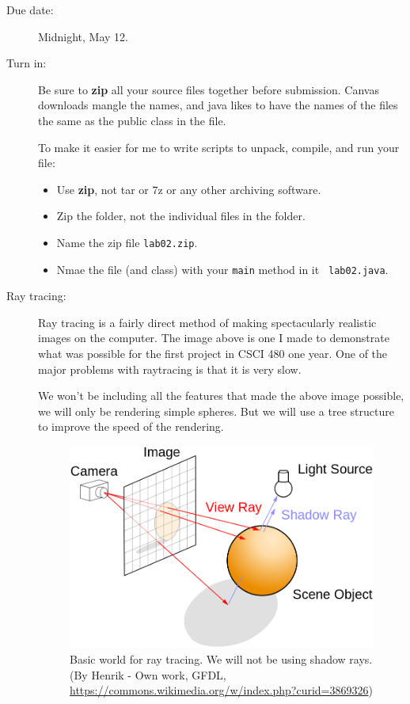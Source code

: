 \documentclass{article}
\begin{document}
\begin{description}

\item[Due date:] Midnight, May 12.

\item[Turn in:] Be sure to {\bf zip} all your source files together
  before submission.  Canvas downloads mangle the names, and java
  likes to have the names of the files the same as the public class in
  the file.

  To make
  it easier for me to write scripts to unpack, compile, and run your
  file:
  \begin{itemize}
    \item
      Use {\bf zip}, not tar or 7z or any other archiving software.
      \item Zip the folder, not the individual  files in the folder.
      \item Name the zip file {\tt lab02.zip}.
\item
  Nmae the file (and class) with your {\tt main} method in it {\tt
    lab02.java}. 
  \end{itemize}
  
\item[Ray tracing:]
Ray tracing is a fairly direct method of making spectacularly
realistic images on the computer.  The image above is one I made to
demonstrate what was possible for the first project in CSCI 480 one
year.  One of the major problems with raytracing is that it is very
slow. 

We won't be including all the features that made the above image
possible, we will only be rendering simple spheres.  But we will use a
tree structure to improve the speed of the rendering.


  \begin{figure}
\centerline{\includegraphics[scale=0.25]{Ray_trace_diagram.png}}
\caption{Basic world for ray tracing.  We will not be using shadow
  rays.
  (By Henrik - Own work, GFDL,
  \url{https://commons.wikimedia.org/w/index.php?curid=3869326})}
    \label{raytracing}
  \end{figure}


\end{description}
\end{document}
